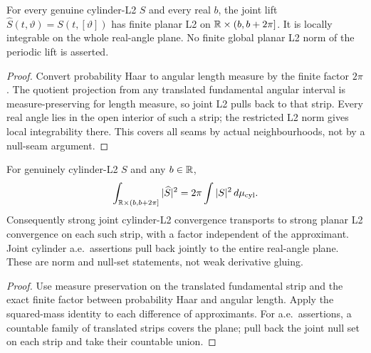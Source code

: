 \begin{lemma}
\label{lem:cylinder-lift-local-mass}
\leanok
For every genuine cylinder-L2 $S$ and every real $b$, the joint lift
$\widehat S(t,\vartheta)=S(t,[\vartheta])$ has finite planar L2 on
$\mathbb{R}\times(b,b+2\pi]$. It is locally integrable on the whole real-angle plane.
No finite global planar L2 norm of the periodic lift is asserted.
\end{lemma}

\begin{proof}
\leanok
Convert probability Haar to angular length measure by the finite factor $2\pi$.
The quotient projection from any translated fundamental angular interval is
measure-preserving for length measure, so joint L2 pulls back to that strip.
Every real angle lies in the open interior of such a strip; the restricted L2
norm gives local integrability there. This covers all seams by actual
neighbourhoods, not by a null-seam argument.
\end{proof}

\begin{lemma}
\label{lem:cylinder-lift-l2-convergence}
\leanok
For genuinely cylinder-L2 $S$ and any $b\in\mathbb{R}$,
\[
 \int_{\mathbb{R}\times(b,b+2\pi]}|\widehat S|^2
   =2\pi\int |S|^2\,d\mu_{\rm cyl}.
\]
Consequently strong joint cylinder-L2 convergence transports to strong planar
L2 convergence on each such strip, with a factor independent of the approximant.
Joint cylinder a.e.\ assertions pull back jointly to the entire real-angle plane.
These are norm and null-set statements, not weak derivative gluing.
\end{lemma}

\begin{proof}
\leanok
Use measure preservation on the translated fundamental strip and the exact
finite factor between probability Haar and angular length.
Apply the squared-mass identity to each difference of approximants.
For a.e.\ assertions, a countable family of translated strips covers the plane;
pull back the joint null set on each strip and take their countable union.
\end{proof}

